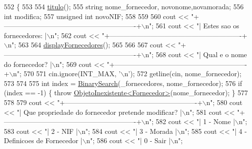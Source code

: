 \begin{DoxyCode}
552                                  \{
553 
554     \hyperlink{classEmpresa_ad79f7196a8ce7256771cbd7b9542155c}{titulo}();
555     \textcolor{keywordtype}{string} nome\_fornecedor, novonome,novamorada;
556     \textcolor{keywordtype}{int} modifica;
557     \textcolor{keywordtype}{unsigned} \textcolor{keywordtype}{int} novoNIF;
558 
559 
560     cout << \textcolor{stringliteral}{"+----------------------------------------------------------+\(\backslash\)n"};
561     cout << \textcolor{stringliteral}{"| Estes sao os fornecedores:                               |\(\backslash\)n"};
562     cout << \textcolor{stringliteral}{"+----------------------------------------------------------+\(\backslash\)n"};
563 
564     \hyperlink{classEmpresa_a55c3756c01b45b41ad03f4e4f3e4dcac}{displayFornecedores}();
565 
566 
567     cout << \textcolor{stringliteral}{"+----------------------------------------------------------+\(\backslash\)n"};
568     cout << \textcolor{stringliteral}{"| Qual e o nome do fornecedor?                             |\(\backslash\)n"};
569     cout << \textcolor{stringliteral}{"+----------------------------------------------------------+\(\backslash\)n"};
570 
571     cin.ignore(INT\_MAX, \textcolor{charliteral}{'\(\backslash\)n'});
572     getline(cin, nome\_fornecedor);
573     
574 
575     \textcolor{keywordtype}{int} index = \hyperlink{extras_8h_abc85c93edf561168b5bbee8054caa388}{BinarySearch}(\_fornecedores, nome\_fornecedor);
576     \textcolor{keywordflow}{if} (index == -1) \{ \textcolor{keywordflow}{throw} \hyperlink{classObjetoInexistente}{ObjetoInexistente<Fornecedor>}(nome\_fornecedor); \}
577 
578 
579     cout << \textcolor{stringliteral}{"+----------------------------------------------------------+\(\backslash\)n"};
580     cout << \textcolor{stringliteral}{"| Que propriedade do fornecedor pretende modificar?        |\(\backslash\)n"};
581     cout << \textcolor{stringliteral}{"+----------------------------------------------------------+\(\backslash\)n"};
582     cout << \textcolor{stringliteral}{"| 1 - Nome                                                 |\(\backslash\)n"};
583     cout << \textcolor{stringliteral}{"| 2 - NIF                                                  |\(\backslash\)n"};
584     cout << \textcolor{stringliteral}{"| 3 - Morada                                               |\(\backslash\)n"};
585     cout << \textcolor{stringliteral}{"| 4 - Definicoes de Fornecedor                             |\(\backslash\)n"};
586     cout << \textcolor{stringliteral}{"| 0 - Sair                                                 |\(\backslash\)n"};

\end{DoxyCode}
